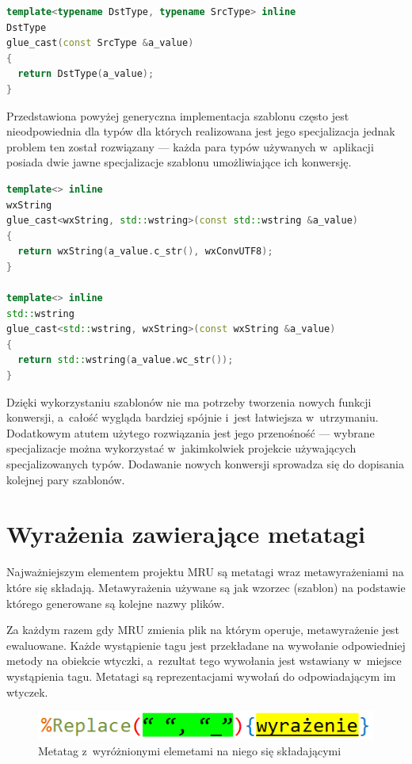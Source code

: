 \begin{lstlisting}[caption={ glue.hpp}, language=C++]
template<typename DstType, typename SrcType> inline
DstType
glue_cast(const SrcType &a_value)
{
  return DstType(a_value);
}
\end{lstlisting}

\par
Przedstawiona powyżej generyczna implementacja szablonu często jest nieodpowiednia dla typów dla których realizowana jest jego specjalizacja jednak problem ten został rozwiązany --- każda para typów używanych w~aplikacji posiada dwie jawne specjalizacje szablonu umożliwiające ich konwersję.
\clearpage
\begin{lstlisting}[caption={ Fragment glue\_impl.hpp --- specjalizacja dla std::wstring i~wxString}, language=C++]
template<> inline
wxString
glue_cast<wxString, std::wstring>(const std::wstring &a_value)
{
  return wxString(a_value.c_str(), wxConvUTF8);
}

template<> inline
std::wstring
glue_cast<std::wstring, wxString>(const wxString &a_value)
{
  return std::wstring(a_value.wc_str());
}

\end{lstlisting}

\par
Dzięki wykorzystaniu szablonów nie ma potrzeby tworzenia nowych funkcji konwersji, a~całość wygląda bardziej spójnie i~jest łatwiejsza w~utrzymaniu. Dodatkowym atutem użytego rozwiązania jest jego przenośność --- wybrane specjalizacje można wykorzystać w~jakimkolwiek projekcie używających specjalizowanych typów. Dodawanie nowych konwersji sprowadza się do dopisania kolejnej pary szablonów.

\section{Wyrażenia zawierające metatagi}
Najważniejszym elementem projektu MRU są metatagi wraz metawyrażeniami na które się składają.
Metawyrażenia używane są jak wzorzec (szablon) na podstawie którego generowane są kolejne nazwy plików.

\par
Za każdym razem gdy MRU zmienia plik na którym operuje, metawyrażenie jest ewaluowane. Każde wystąpienie tagu jest przekładane na wywołanie odpowiedniej metody na obiekcie wtyczki, a~rezultat tego wywołania jest wstawiany w~miejsce wystąpienia tagu.
Metatagi są reprezentacjami wywołań do odpowiadającym im wtyczek.

\begin{figure}
\begin{center}
\includegraphics[scale=0.50]{img/metatag_sample.png}
\end{center}
\caption{Metatag z~wyróżnionymi elemetami na niego się składającymi}
\end{figure}


